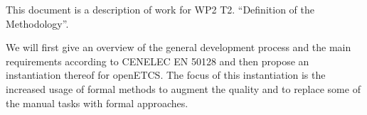 
This document is a description of work for WP2 T2. ``Definition of the
Methodology''.

We will first give an overview of the general development process and the main
requirements according to CENELEC EN 50128 and then propose an instantiation
thereof for openETCS. The focus of this instantiation is the increased usage of
formal methods to augment the quality and to replace some of the manual tasks
with formal approaches.

